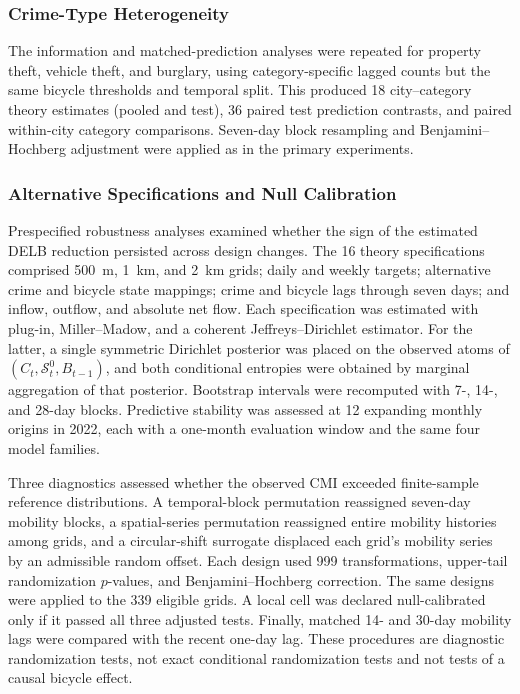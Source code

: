 \subsubsection{Crime-Type Heterogeneity}
\label{subsec:crime_type_methods}

The information and matched-prediction analyses were repeated for property
theft, vehicle theft, and burglary, using category-specific lagged counts
but the same bicycle thresholds and temporal split. This produced 18
city--category theory estimates (pooled and test), 36 paired test prediction
contrasts, and paired within-city category comparisons. Seven-day block
resampling and Benjamini--Hochberg adjustment were applied as in the primary
experiments.

\subsubsection{Alternative Specifications and Null Calibration}
\label{subsec:robustness_null_methods}

Prespecified robustness analyses examined whether the sign of the estimated
DELB reduction persisted across design changes. The 16 theory
specifications comprised
500~m, 1~km, and 2~km grids; daily and weekly targets; alternative crime and
bicycle state mappings; crime and bicycle lags through seven days; and
inflow, outflow, and absolute net flow. Each specification was estimated
with plug-in, Miller--Madow, and a coherent Jeffreys--Dirichlet estimator.
For the latter, a single symmetric Dirichlet posterior was placed on the
observed atoms of \((C_t,\mathcal S^0_t,B_{t-1})\), and both conditional
entropies were obtained by marginal aggregation of that posterior. Bootstrap
intervals were recomputed with 7-, 14-, and 28-day blocks. Predictive
stability was assessed at 12 expanding monthly origins in 2022, each with a
one-month evaluation window and the same four model families.

Three diagnostics assessed whether the observed CMI exceeded finite-sample
reference distributions. A temporal-block permutation reassigned seven-day mobility
blocks, a spatial-series permutation reassigned entire mobility histories
among grids, and a circular-shift surrogate displaced each grid's mobility
series by an admissible random offset. Each design used 999 transformations,
upper-tail randomization \(p\)-values, and Benjamini--Hochberg correction.
The same designs were applied to the 339 eligible grids. A local cell
was declared null-calibrated only if it passed all three adjusted tests.
Finally, matched 14- and 30-day mobility lags were compared with the recent
one-day lag. These procedures are diagnostic randomization tests, not exact
conditional randomization tests and not tests of a causal bicycle effect.

